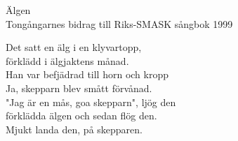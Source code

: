  {\Large Älgen}\\{\tiny  Tongångarnes bidrag till Riks-SMASK sångbok 1999}
  \begin{vers}
Det satt en älg i en klyvartopp, \\
förklädd i älgjaktens månad. \\
Han var befjädrad till horn och kropp \\
Ja, skepparn blev smått förvånad. \\
"Jag är en mås, goa skepparn", ljög den \\
förklädda älgen och sedan flög den. \\
Mjukt landa den, på skepparen. \\
\end{vers}